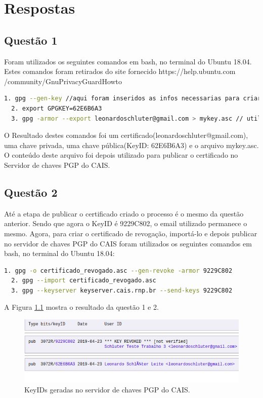 \documentclass[openany]{ufsctex/ufsctex}
\begin{document}
    \folhaderosto
    \sumario
    
\chapter{Respostas}
    \section{Questão 1}
    Foram utilizados os seguintes comandos em bash, no terminal do Ubuntu 18.04. Estes comandos foram retirados do site fornecido https://help.ubuntu.com /community/GnuPrivacyGuardHowto
    
\begin{lstlisting}[language=bash,breaklines=true, tabsize=2,basicstyle =\fontsize{9}{11}]
  1. gpg --gen-key //aqui foram inseridos as infos necessarias para criar o certificado e a chave
  2. export GPGKEY=62E6B6A3
  3. gpg -armor --export leonardoschluter@gmail.com > mykey.asc // utilizado para exportar minha chave publica
\end{lstlisting}


O Resultado destes comandos foi um certificado(leonardoschluter@gmail.com), uma chave privada, uma chave pública(KeyID: 62E6B6A3) e o arquivo mykey.asc. O conteúdo deste arquivo foi depois utilizado para publicar o certificado no Servidor de chaves PGP do CAIS.

	\section{Questão 2}
		Até a etapa de publicar o certificado criado o processo é o mesmo da questão anterior. Sendo que agora o KeyID é 9229C802, o email utilizado permanece o mesmo. Agora, para criar o certificado de revogação, importá-lo e depois publicar no servidor de chaves PGP do CAIS foram utilizados os seguintes comandos em bash, no terminal do Ubuntu 18.04:
		
\begin{lstlisting}[language=bash,breaklines=true, tabsize=2,basicstyle =\fontsize{9}{11}]
  1. gpg -o certificado_revogado.asc --gen-revoke -armor 9229C802
  2. gpg --import certificado_revogado.asc 
  3. gpg --keyserver keyserver.cais.rnp.br --send-keys 9229C802
\end{lstlisting}

	
A Figura \ref{fig:a} mostra o resultado da questão 1 e 2.


\begin{figure}[!htb]
   \centering
   \caption{KeyIDs geradas no servidor de chaves PGP do CAIS.}\label{fig:a}
   \includegraphics[scale=0.6]{images/questao2.png}
\end{figure}
\end{document}
